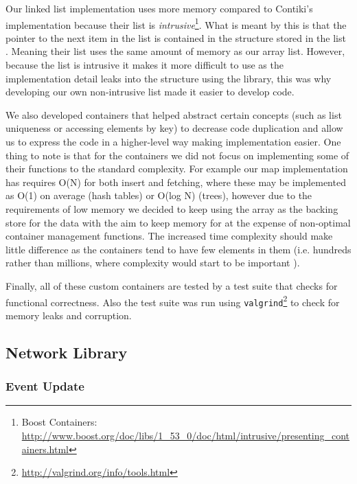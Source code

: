 Our linked list implementation uses more memory compared to Contiki's implementation because their list is \emph{intrusive}\footnote{Boost Containers: \url{http://www.boost.org/doc/libs/1\_53\_0/doc/html/intrusive/presenting\_containers.html}}. What is meant by this is that the pointer to the next item in the list is contained in the structure stored in the list \cite{?}. Meaning their list uses the same amount of memory as our array list. However, because the list is intrusive it makes it more difficult to use as the implementation detail leaks into the structure using the library, this was why developing our own non-intrusive list made it easier to develop code.

We also developed containers that helped abstract certain concepts (such as list uniqueness or accessing elements by key) to decrease code duplication and allow us to express the code in a higher-level way making implementation easier. One thing to note is that for the containers we did not focus on implementing some of their functions to the standard complexity. For example our map implementation has requires O(N) for both insert and fetching, where these may be implemented as O(1) on average (hash tables) or O(log N) (trees), however due to the requirements of low memory we decided to keep using the array as the backing store for the data with the aim to keep memory for at the expense of non-optimal container management functions. The increased time complexity should make little difference as the containers tend to have few elements in them (i.e. hundreds rather than millions, where complexity would start to be important \cite{?}).

Finally, all of these custom containers are tested by a test suite that checks for functional correctness. Also the test suite was run using \verb|valgrind|\footnote{\url{http://valgrind.org/info/tools.html}} to check for memory leaks and corruption.

\subsection{Network Library}

\subsubsection{Event Update}

